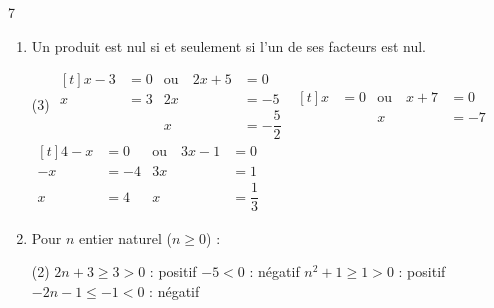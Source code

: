 \documentclass[10pt,a4paper]{article}
\begin{document}
\begin{corr}{7}
\begin{enumerate}[leftmargin=*]
    \item Un produit est nul si et seulement si l'un de ses facteurs est nul.
    \begin{tasks}(3)
        \task \(\begin{aligned}[t] x-3&=0 &\text{ou}\quad 2x+5&=0\\ x&=3 & 2x&=-5\\ & & x&=-\dfrac{5}{2}\end{aligned}\)
        \task \(\begin{aligned}[t] x&=0 &\text{ou}\quad x+7&=0\\ & & x&=-7\end{aligned}\)
        \task \(\begin{aligned}[t] 4-x&=0 &\text{ou}\quad 3x-1&=0\\ -x&=-4 & 3x&=1\\ x&=4 & x&=\dfrac{1}{3}\end{aligned}\)
    \end{tasks}
    \item Pour \(n\) entier naturel (\(n\geq 0\)) :
    \begin{tasks}(2)
        \task \(2n+3\geq 3>0\) : positif
        \task \(-5<0\) : négatif
        \task \(n^2+1\geq 1>0\) : positif
        \task \(-2n-1\leq -1<0\) : négatif
    \end{tasks}
\end{enumerate}
\end{corr}
\end{document}
